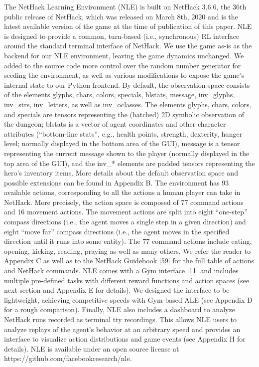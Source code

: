 The NetHack Learning Environment (NLE) is built on NetHack 3.6.6, the 36th public release of
NetHack, which was released on March 8th, 2020 and is the latest available version of the game
at the time of publication of this paper. NLE is designed to provide a common, turn-based (i.e.,
synchronous) RL interface around the standard terminal interface of NetHack. We use the game as-is
as the backend for our NLE environment, leaving the game dynamics unchanged. We added to the
source code more control over the random number generator for seeding the environment, as well as
various modifications to expose the game’s internal state to our Python frontend.
By default, the observation space consists of the elements glyphs, chars, colors, specials, blstats,
message, inv_glyphs, inv_strs, inv_letters, as well as inv_oclasses. The elements glyphs, chars, colors,
and specials are tensors representing the (batched) 2D symbolic observation of the dungeon; blstats
is a vector of agent coordinates and other character attributes (“bottom-line stats”, e.g., health points,
strength, dexterity, hunger level; normally displayed in the bottom area of the GUI), message is a
tensor representing the current message shown to the player (normally displayed in the top area of
the GUI), and the inv_* elements are padded tensors representing the hero’s inventory items. More
details about the default observation space and possible extensions can be found in Appendix B.
The environment has 93 available actions, corresponding to all the actions a human player can take in
NetHack. More precisely, the action space is composed of 77 command actions and 16 movement
actions. The movement actions are split into eight “one-step” compass directions (i.e., the agent
moves a single step in a given direction) and eight “move far” compass directions (i.e., the agent
moves in the specified direction until it runs into some entity). The 77 command actions include
eating, opening, kicking, reading, praying as well as many others. We refer the reader to Appendix C
as well as to the NetHack Guidebook [59] for the full table of actions and NetHack commands.
NLE comes with a Gym interface [11] and includes multiple pre-defined tasks with different reward
functions and action spaces (see next section and Appendix E for details). We designed the interface
to be lightweight, achieving competitive speeds with Gym-based ALE (see Appendix D for a rough
comparison). Finally, NLE also includes a dashboard to analyze NetHack runs recorded as terminal
tty recordings. This allows NLE users to analyze replays of the agent’s behavior at an arbitrary speed
and provides an interface to visualize action distributions and game events (see Appendix H for details).
NLE is available under an open source license at https://github.com/facebookresearch/nle.

